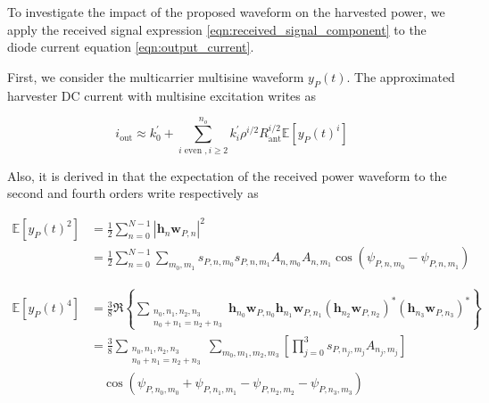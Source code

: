 To investigate the impact of the proposed waveform on the harvested power, we apply the received signal expression \ref{eqn:received_signal_component} to the diode current equation \ref{eqn:output_current}.

First, we consider the multicarrier multisine waveform ${y_P}(t)$. The approximated harvester DC current with multisine excitation writes as

\begin{equation}\label{eqn:current_power}
  {i_{\text{out}}} \approx k_0^\prime  + \sum\limits_{i{\text{ even }},i \geqslant 2}^{{n_o}} {k_i^\prime } {\rho ^{i/2}}R_{\text{ant}}^{i/2}\mathbb{E}\left[ {{y_P}{{(t)}^i}} \right]
\end{equation}

Also, it is derived in \cite{Clerckx2016} that the expectation of the received power waveform to the second and fourth orders write respectively as

\begin{align}\label{eqn:power_waveform_second_order}
  \mathbb{E}\left[ {{y_P}{{(t)}^2}} \right] &= \frac{1}{2}\sum\limits_{n = 0}^{N - 1} {{{\left| {{{\mathbf{h}}_n}{{\mathbf{w}}_{P,n}}} \right|}^2}} \\
   &= \frac{1}{2}\sum\limits_{n = 0}^{N - 1} {\sum\limits_{{m_0},{m_1}} {{s_{P,n,{m_0}}}{s_{P,n,{m_1}}}{A_{n,{m_0}}}{A_{n,{m_1}}}\cos \left( {{\psi _{P,n,{m_0}}} - {\psi _{P,n,{m_1}}}} \right)} }
\end{align}

\begin{align}\label{eqn:power_waveform_fourth_order}
  \mathbb{E}\left[ {{y_P}{{(t)}^4}} \right] &= \frac{3}{8}\Re \left\{ {\sum\limits_{\substack{{n_0},{n_1},{n_2},{n_3} \\ {n_0} + {n_1} = {n_2} + {n_3}}} {{{\mathbf{h}}_{{n_0}}}{{\mathbf{w}}_{P,{n_0}}}{{\mathbf{h}}_{{n_1}}}{{\mathbf{w}}_{P,{n_1}}}{{\left( {{{\mathbf{h}}_{{n_2}}}{{\mathbf{w}}_{P,{n_2}}}} \right)}^*}{{\left( {{{\mathbf{h}}_{{n_3}}}{{\mathbf{w}}_{P,{n_3}}}} \right)}^*}} } \right\} \\
   &= \frac{3}{8}\sum\limits_{\substack{{n_0},{n_1},{n_2},{n_3} \\ {n_0} + {n_1} = {n_2} + {n_3}}} {\sum\limits_{{m_0},{m_1},{m_2},{m_3}} {\left[ {\prod\limits_{j = 0}^3 {{s_{{P},{n_j},{m_j}}}} {A_{{n_j},{m_j}}}} \right] }} \nonumber \\
   &\quad \cos \left( {{\psi _{{P},{n_0},{m_0}}} + {\psi _{{P},{n_1},{m_1}}} - {\psi _{{P},{n_2},{m_2}}} - {\psi _{{P},{n_3},{m_3}}}} \right)
\end{align}

